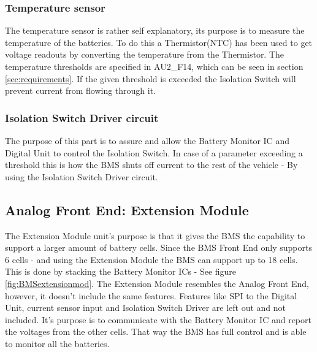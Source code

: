 \subsubsection{Temperature sensor}
The temperature sensor is rather self explanatory, its purpose is to measure the temperature of the batteries. To do this a Thermistor(NTC) has been used to get voltage readouts by converting the temperature from the Thermistor. The temperature thresholds are specified in AU2\_F14, which can be seen in section \vref{sec:requirements}. If the given threshold is exceeded the Isolation Switch will prevent current from flowing through it.

\subsubsection{Isolation Switch Driver circuit}
The purpose of this part is to assure and allow the Battery Monitor IC and Digital Unit to control the Isolation Switch. In case of a parameter exceeding a threshold this is how the BMS shuts off current to the rest of the vehicle - By using the Isolation Switch Driver circuit.

\subsection{Analog Front End: Extension Module}
The Extension Module unit's purpose is that it gives the BMS the capability to support a larger amount of battery cells. Since the BMS Front End only supports 6 cells - and using the Extension Module the BMS can support up to 18 cells. This is done by stacking the Battery Monitor ICs - See figure \vref{fig:BMSextensionmod}. The Extension Module resembles the Analog Front End, however, it doesn't include the same features. Features like SPI to the Digital Unit, current sensor input and Isolation Switch Driver are left out and not included. It's purpose is to communicate with the Battery Monitor IC and report the voltages from the other cells. That way the BMS has full control and is able to monitor all the batteries.\\

